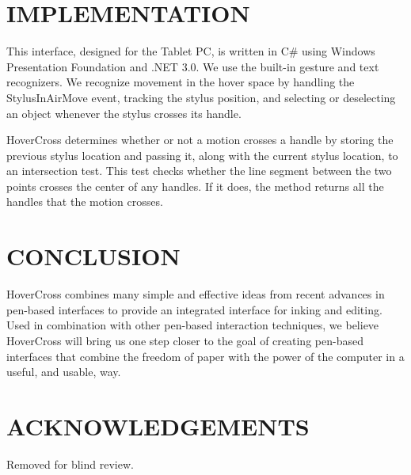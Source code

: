 \documentclass{article}
\begin{document}



\section{IMPLEMENTATION}

This interface, designed for the Tablet PC, is written in C\# using
Windows Presentation Foundation and .NET 3.0.  We use the built-in
gesture and text recognizers.  We recognize movement in the hover
space by handling the StylusInAirMove event, tracking the stylus
position, and selecting or deselecting an object whenever the stylus
crosses its handle.

HoverCross determines whether or not a motion crosses a handle by storing the previous stylus location and passing it, along with the current stylus location, to an intersection test.  This test checks whether the line segment between the two points crosses the center of any handles.  If it does, the method returns all the handles that the motion crosses.


\section{CONCLUSION}
HoverCross combines many simple and effective ideas from
recent advances in pen-based interfaces to provide an integrated
interface for inking and editing.  Used in combination with other
pen-based interaction techniques, we believe HoverCross will bring us one step
closer to the goal of creating pen-based interfaces that combine the
freedom of paper with the power of the computer in a useful, and
usable, way.  


\section{ACKNOWLEDGEMENTS}
Removed for blind review.


\end{document}
